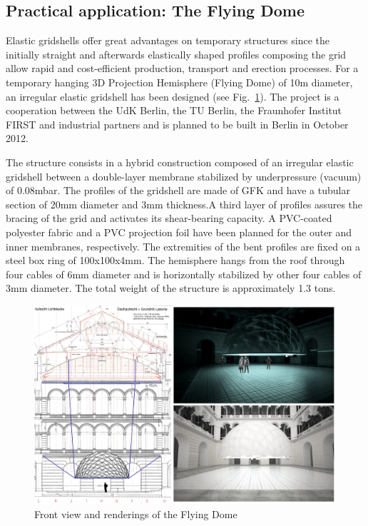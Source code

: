 \subsection{Practical application: The Flying Dome}

Elastic gridshells offer great advantages on temporary structures since the initially straight and afterwards elastically shaped profiles composing the grid allow rapid and cost-efficient production, transport and erection processes. For a temporary hanging 3D Projection Hemisphere (Flying Dome) of 10m diameter, an irregular elastic gridshell has been designed (see Fig.~\ref{fig:Renderings}). The project is a cooperation between the UdK Berlin, the TU Berlin, the Fraunhofer Institut FIRST and industrial partners and is planned to be built in Berlin in October 2012.

The structure consists in a hybrid construction composed of an irregular elastic gridshell between a double-layer membrane stabilized by underpressure (vacuum) of 0.08mbar. The profiles of the gridshell are made of GFK and have a tubular section of 20mm diameter and 3mm thickness.A third layer of profiles assures the bracing of the grid and activates its shear-bearing capacity. A PVC-coated polyester fabric and a PVC projection foil have been planned for the outer and inner membranes, respectively. The extremities of the bent profiles are fixed on a steel box ring of 100x100x4mm. The hemisphere hangs from the roof through four cables of 6mm diameter and is horizontally stabilized by other four cables of 3mm diameter. The total weight of the structure is approximately 1.3 tons.

\begin{figure}[ht]
\centering
\includegraphics[width=1.0\linewidth]{images/Renderings_Modell/Renderings_lowres.png}
\caption{Front view and renderings of the Flying Dome}
\label{fig:Renderings}
\end{figure}

